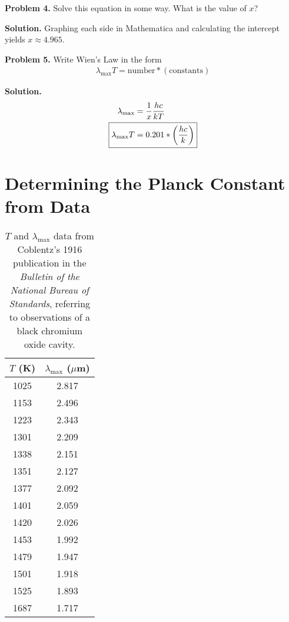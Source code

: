 \documentclass{article}
\begin{document}
\textbf{Problem 4.} Solve this equation in some way. What is the value of $x$?

\textbf{Solution.} Graphing each side in Mathematica and calculating the intercept yields $\boxed{x \approx 4.965}$.

\textbf{Problem 5.} Write Wien's Law in the form
\begin{equation*}
\begin{aligned}
\lambda_\text{max} T = \text{number} * \left(\text{constants}\right)
\end{aligned}
\end{equation*}

\textbf{Solution.}
\begin{equation*}
\begin{aligned}
\lambda_\text{max} &= \frac{1}{x}\frac{hc}{kT} \\
\Aboxed{\lambda_\text{max} T &= 0.201 * \left(\frac{hc}{k}\right)}
\end{aligned}
\end{equation*}

\section{Determining the Planck Constant from Data}

\begin{table}[H]
	\centering
	\begin{tabular}{cc}
		\toprule
		$T$ (K) & $\lambda_\text{max}$ ($\mu$m) \\
		\midrule
		1025 & 2.817 \\
		1153 & 2.496 \\
		1223 & 2.343 \\
		1301 & 2.209 \\
		1338 & 2.151 \\
		1351 & 2.127 \\
		1377 & 2.092 \\
		1401 & 2.059 \\
		1420 & 2.026 \\
		1453 & 1.992 \\
		1479 & 1.947 \\
		1501 & 1.918 \\
		1525 & 1.893 \\
		1687 & 1.717 \\
		\bottomrule
	\end{tabular}
	\caption{$T$ and $\lambda_\text{max}$ data from Coblentz's 1916 publication in the \textit{Bulletin of the National Bureau of Standards}, referring to observations of a black chromium oxide cavity.}
\end{table}
\end{document}
